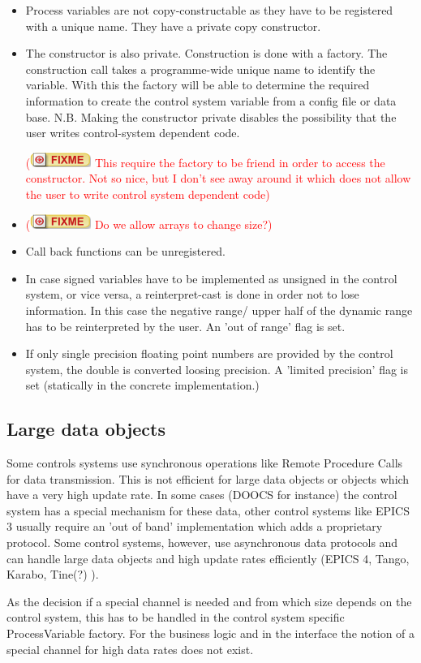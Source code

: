 \documentclass[11pt,a4paper]{scrartcl}
\newcounter{nFixmes}
\newcommand{\fixme}[1]{\addtocounter{nFixmes}{1}\textcolor{red}{(\includegraphics[height=2ex]{fixme} #1)}\xspace}
\begin{document}
\begin{itemize}
\item Process variables are not copy-constructable as they have to be registered with a unique name. They have a private copy constructor.
\item The constructor is also private. Construction is done with a factory. The construction call takes a programme-wide unique name to identify the variable. With this the factory will be able to determine the required information to create the control system variable from a config file or data base.
N.B. Making the constructor private disables the possibility that the user writes control-system dependent code.
\fixme{This require the factory to be friend in order to access the constructor. Not so nice, but I don't see away around it which does not allow the user to write control system dependent code}
\item \fixme{Do we allow arrays to change size?}
\item Call back functions can be unregistered.
\item In case signed variables have to be implemented as unsigned in the control system, or vice versa, a reinterpret-cast is done in order not to lose information. In this case the negative range/ upper half of the dynamic range has to be reinterpreted by the user. An 'out of range' flag is set.
\item If only single precision floating point numbers are provided by the control system, the double is converted loosing precision. A 'limited precision' flag is set (statically in the concrete implementation.)
\end{itemize}

\subsection{Large data objects}

Some controls systems use synchronous operations like Remote Procedure Calls for data transmission. This is not efficient for large data objects or objects which have a very high update rate. In some cases (DOOCS for instance) the control system has a special mechanism for these data, other control systems like EPICS 3 usually require an 'out of band' implementation which adds a proprietary protocol. Some control systems, however, use asynchronous data protocols and can handle large data objects and high update rates efficiently (EPICS 4, Tango, Karabo, Tine(?) ).

As the decision if a special channel is needed and from which size depends on the control system, this has to be handled in the control system specific ProcessVariable factory. For the business logic and in the interface the notion of a special channel for high data rates does not exist.
\end{document}
